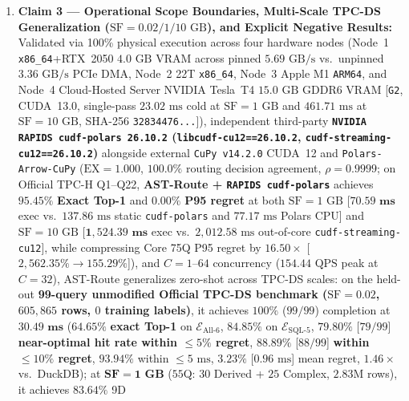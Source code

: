 \documentclass[10pt,a4paper]{article}
\begin{document}
\begin{enumerate}[leftmargin=1.5em,itemsep=3pt]
\textbf{Policy~P3 $(0.2,0.1,0.7)$} enforces $\mathbf{\$0.00/1\text{M}}$ cloud spend at $\text{SF}=100\text{ GB}$ (saving $\mathbf{\$507.06/1\text{M}}$, $\mathcal{R}_C=0.0\%$), and Balanced \textbf{Policy~P4 $(0.5,0.3,0.2)$} achieves the maximum 3D Pareto Hypervolume ($\mathbf{\text{HV}=0.9210}$ at $\text{SF}=1\text{ GB}$, $\mathbf{0.9340}$ at $\text{SF}=100\text{ GB}$). Practically, a \textbf{Minimalist 2-Engine Subset ($\mathcal{E}_{\text{Min-2}}=\{\text{Polars},\text{GPU}\}$: $\mathbf{55.28\text{ ms}}$)} captures $\mathbf{98.7\%}$ of the 6-engine gain ($\mathcal{E}_{\text{Prod-3}}=\{\text{DuckDB},\text{Polars},\text{GPU}\}$: $\mathbf{55.07\text{ ms}}$ captures $\mathbf{99.5\%}$ with $0.0\text{ MB}$ storage duplication; Pure-SQL $\mathcal{E}_{\text{SQL-5}}: \mathbf{69.12\text{ ms}}$ captures $48.5\%$).
    \item \textbf{Claim 3 --- Operational Scope Boundaries, Multi-Scale TPC-DS Generalization ($\text{SF}=0.02 / 1 / 10\text{ GB}$), and Explicit Negative Results:} Validated via 100\% physical execution across four hardware nodes (Node~1 \texttt{x86\_64}+RTX~2050 $4.0\text{ GB}$ VRAM across pinned $5.69\text{ GB/s}$ vs.\ unpinned $3.36\text{ GB/s}$ PCIe DMA, Node~2 22T \texttt{x86\_64}, Node~3 Apple M1 \texttt{ARM64}, and Node~4 Cloud-Hosted Server NVIDIA Tesla~T4 $15.0\text{ GB}$ GDDR6 VRAM [\texttt{G2}, CUDA~13.0, single-pass $23.02\text{ ms}$ cold at $\text{SF}=1\text{ GB}$ and $461.71\text{ ms}$ at $\text{SF}=10\text{ GB}$, SHA-256 \texttt{32834476...}]), independent third-party \textbf{\texttt{NVIDIA RAPIDS cudf-polars 26.10.2} (\texttt{libcudf-cu12==26.10.2}, \texttt{cudf-streaming-cu12==26.10.2})} alongside external \texttt{CuPy v14.2.0} CUDA~12 and \texttt{Polars-Arrow-CuPy} ($\text{EX}=1.000$, $\mathbf{100.0\%}$ routing decision agreement, $\rho=0.9999$; on Official TPC-H Q1--Q22, \textbf{AST-Route + \texttt{RAPIDS cudf-polars}} achieves $\mathbf{95.45\%}$ \textbf{Exact Top-1} and $\mathbf{0.00\%}$ \textbf{P95 regret} at both $\text{SF}=1\text{ GB}$ [$\mathbf{70.59\text{ ms}}$ exec vs.\ $137.86\text{ ms}$ static \texttt{cudf-polars} and $77.17\text{ ms}$ Polars CPU] and $\text{SF}=10\text{ GB}$ [$\mathbf{1{,}524.39\text{ ms}}$ exec vs.\ $2{,}012.58\text{ ms}$ out-of-core \texttt{cudf-streaming-cu12}], while compressing Core 75Q P95 regret by $\mathbf{16.50\times}$ [$2{,}562.35\%\rightarrow 155.29\%$]), and $C=1\text{--}64$ concurrency ($154.44\text{ QPS}$ peak at $C=32$), AST-Route generalizes zero-shot across TPC-DS scales: on the held-out \textbf{99-query unmodified Official TPC-DS benchmark ($\text{SF}=0.02$, $605{,}865$ rows, $0$ training labels)}, it achieves $100\%$ ($99/99$) completion at $\mathbf{30.49\text{ ms}}$ ($\mathbf{64.65\%}$ \textbf{exact Top-1} on $\mathcal{E}_{\text{All-6}}$, $\mathbf{84.85\%}$ on $\mathcal{E}_{\text{SQL-5}}$, $\mathbf{79.80\%}$ [$79/99$] \textbf{near-optimal hit rate within $\le 5\%$ regret}, $\mathbf{88.89\%}$ [$88/99$] \textbf{within $\le 10\%$ regret}, $\mathbf{93.94\%}$ within $\le 5\text{ ms}$, $\mathbf{3.23\%}$ [$0.96\text{ ms}$] mean regret, $1.46\times$ vs.\ DuckDB); at $\mathbf{\text{SF}=1\text{ GB}}$ ($55$Q: $30$ Derived + $25$ Complex, $2.83\text{M}$ rows), it achieves $\mathbf{83.64\%}$ 9D 
\end{enumerate}
\end{document}
